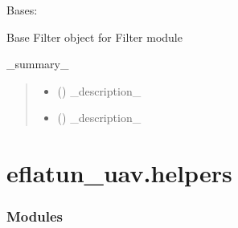 \documentclass[letterpaper,10pt,english]{sphinxmanual}
\begin{document}
\begin{fulllineitems}
\label{\detokenize{generated/eflatun_uav.filters:eflatun_uav.filters.BaseFilter}}
\pysigstartsignatures
{}
\pysigstopsignatures
\sphinxAtStartPar
Bases: 

\sphinxAtStartPar
Base Filter object for Filter module

\begin{fulllineitems}
\label{\detokenize{generated/eflatun_uav.filters:eflatun_uav.filters.BaseFilter.__init__}}
\pysigstartsignatures
{}
\pysigstopsignatures
\sphinxAtStartPar
\_summary\_
\begin{quote}\begin{description}
\begin{itemize}
\item {} 
\sphinxAtStartPar
{} () \textendash{} \_description\_

\item {} 
\sphinxAtStartPar
{} () \textendash{} \_description\_

\end{itemize}

\end{description}\end{quote}

\end{fulllineitems}


\end{fulllineitems}


\sphinxstepscope


\section{eflatun\_uav.helpers}
\label{\detokenize{generated/eflatun_uav.helpers:module-eflatun_uav.helpers}}\label{\detokenize{generated/eflatun_uav.helpers:eflatun-uav-helpers}}\label{\detokenize{generated/eflatun_uav.helpers::doc}}\subsubsection*{Modules}
\end{document}
